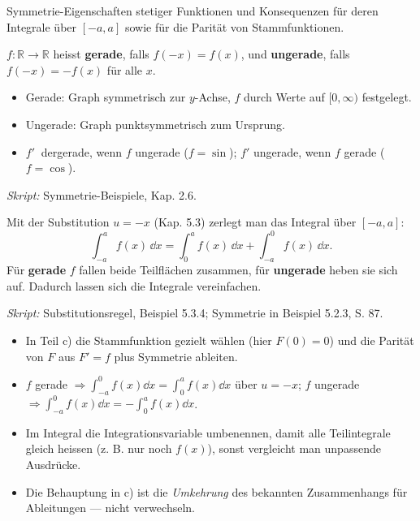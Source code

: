 

Symmetrie-Eigenschaften stetiger Funktionen und Konsequenzen für deren
Integrale über $[-a,a]$ sowie für die Parität von Stammfunktionen.

\begin{werkzeugkasten}
$f:\mathbb R\to\mathbb R$ heisst \textbf{gerade}, falls $f(-x)=f(x)$, und
\textbf{ungerade}, falls $f(-x)=-f(x)$ für alle $x$.
\begin{itemize}
  \item Gerade: Graph symmetrisch zur $y$-Achse, $f$ durch Werte auf
        $[0,\infty)$ festgelegt.
  \item Ungerade: Graph punktsymmetrisch zum Ursprung.
  \item $f'\ $ dergerade, wenn $f$ ungerade ($f=\sin$); $f'$ ungerade,
        wenn $f$ gerade ($f=\cos$).
\end{itemize}
\textit{Skript:} Symmetrie-Beispiele, Kap. 2.6.
\end{werkzeugkasten}

\begin{werkzeugkasten}
Mit der Substitution $u=-x$ (Kap. 5.3) zerlegt man das Integral über
$[-a,a]$:
\begin{equation}
  \int_{-a}^{a} f(x)\,\dd x = \int_0^a f(x)\,\dd x + \int_{-a}^{0} f(x)\,\dd x .
\end{equation}
Für \textbf{gerade} $f$ fallen beide Teilflächen zusammen, für \textbf{ungerade}
heben sie sich auf. Dadurch lassen sich die Integrale vereinfachen.

\textit{Skript:} Substitutionsregel, Beispiel 5.3.4; Symmetrie in
Beispiel 5.2.3, S. 87.
\end{werkzeugkasten}

\begin{achtung}
\begin{itemize}
  \item In Teil c) die Stammfunktion gezielt wählen (hier $F(0)=0$) und die
        Parität von $F$ aus $F'=f$ plus Symmetrie ableiten.
  \item $f$ gerade $\Rightarrow\int_{-a}^{0}f(x)\dd x=\int_0^a f(x)\dd x$
        über $u=-x$; $f$ ungerade $\Rightarrow\int_{-a}^{0}f(x)\dd x=
        -\int_0^a f(x)\dd x$.
  \item Im Integral die Integrationsvariable umbenennen, damit alle
        Teilintegrale gleich heissen (z. B. nur noch $f(x)$), sonst vergleicht
        man unpassende Ausdrücke.
  \item Die Behauptung in c) ist die \emph{Umkehrung} des bekannten
        Zusammenhangs für Ableitungen — nicht verwechseln.
\end{itemize}
\end{achtung}
